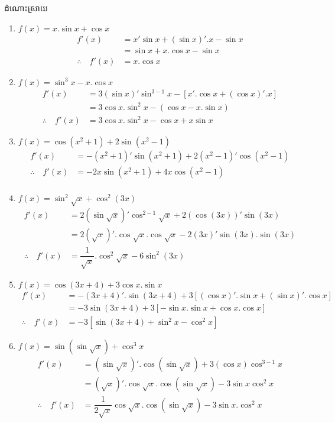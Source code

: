 \documentclass[12pt,fleqn]{book} %
\newcommand{\answer}{\begin{center}
\kml \color{magenta} ដំណោះស្រាយ
\end{center}}
\begin{document}
\answer 
\begin{enumerate}
\item $f(x)=x.\sin x+\cos x$
\begin{align*}
f'(x)&=x'\sin x+(\sin x)'. x-\sin x\\
&=\sin x+x.\cos x-\sin x\\
\therefore \quad f'(x)&=x.\cos x
\end{align*}
\item $f(x)=\sin^3 x-x.\cos x$
\begin{align*}
f'(x)&=3(\sin x)'\sin^{3-1}x-[x'.\cos x+(\cos x)'.x]\\
&=3\cos x. \sin^2 x-(\cos x-x.\sin x)\\
\therefore \quad f'(x)&=3\cos x.\sin^2 x-\cos x +x\sin x
\end{align*}
\item $f(x)=\cos (x^2+1)+2\sin (x^2-1)$
\begin{align*}
f'(x)&=-(x^2+1)'\sin (x^2+1)+2(x^2-1)'\cos (x^2-1)\\
\therefore \quad f'(x)&=-2x\sin (x^2+1)+4x\cos (x^2-1)\\
\end{align*}
\item $f(x)=\sin^2\sqrt{x}+\cos^2 (3x)$
\begin{align*}
f'(x)&=2(\sin \sqrt{x})'\cos^{2-1} \sqrt{x}+2(\cos (3x))' \sin (3x)\\
&=2(\sqrt{x})'.\cos \sqrt{x}.\cos \sqrt{x}-2(3x)'\sin (3x).\sin (3x)\\
\therefore \quad f'(x)&=\dfrac{1}{\sqrt{x}}.\cos^2 \sqrt{x}-6\sin^2 (3x)
\end{align*}
\item $f(x)=\cos (3x+4)+3\cos x.\sin x$
\begin{align*}
f'(x)&=-(3x+4)'.\sin (3x+4)+3[(\cos x)'.\sin x+(\sin x)'.\cos x]\\
&=-3\sin (3x+4)+3[-\sin x.\sin x+\cos x.\cos x]\\
\therefore \quad f'(x)&=-3[\sin (3x+4)+\sin^2x -\cos^2 x]
\end{align*}
\item $f(x)=\sin (\sin \sqrt{x})+\cos^3 x$
\begin{align*}
f'(x)&=(\sin \sqrt{x})'.\cos (\sin \sqrt{x})+3(\cos x)\cos^{3-1}x\\
&=(\sqrt{x})'.\cos \sqrt{x}.\cos(\sin \sqrt{x})-3\sin x\cos ^2 x\\
\therefore \quad f'(x)&=\dfrac{1}{2\sqrt{x}}\cos \sqrt{x}.\cos (\sin \sqrt{x})-3\sin x.\cos^2 x
\end{align*}
\end{enumerate}
\end{document}

